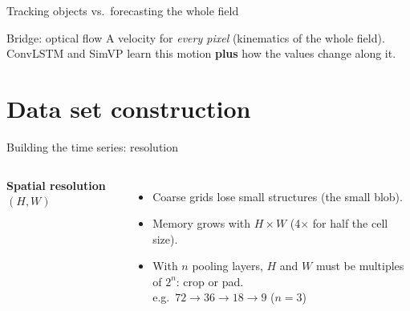 \documentclass{beamer}
\begin{document}
\begin{frame}{Tracking objects vs.\ forecasting the whole field}
	\vspace{-0.1cm}
	\begin{block}{Bridge: optical flow}
		\scriptsize A velocity for \emph{every pixel} (kinematics of the whole field). ConvLSTM and SimVP learn this motion \textbf{plus} how the values change along it.
	\end{block}
\end{frame}

\section{Data set construction}

\begin{frame}{Building the time series: resolution}
    \begin{columns}[t]
        \centering
        \textbf{Spatial resolution} $(H, W)$

        \vspace{0.1cm}

        \raggedright
        \scriptsize
        \begin{itemize}
            \item Coarse grids lose small structures (the small blob).
            \item Memory grows with $H \times W$ (4$\times$ for half the cell size).
            \item With $n$ pooling layers, $H$ and $W$ must be multiples of $2^n$: crop or pad. \\
                {\tiny e.g.\ $72 \rightarrow 36 \rightarrow 18 \rightarrow 9$ ($n=3$)}
        \end{itemize}


\end{columns}
\end{frame}
\end{document}
